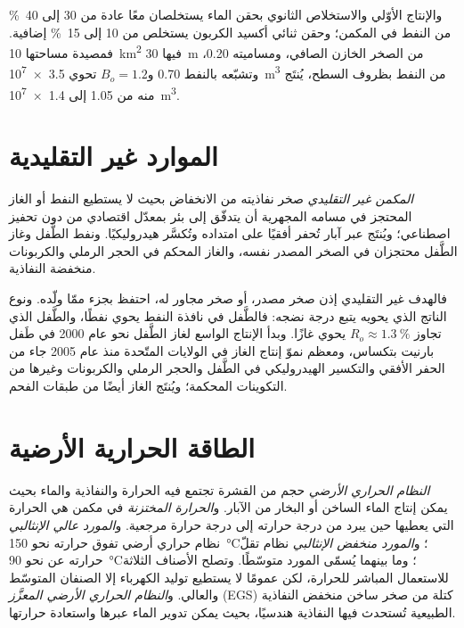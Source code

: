 والإنتاج الأوّلي والاستخلاص الثانوي بحقن الماء يستخلصان معًا عادة من 30 إلى \qty{40}{\percent} من النفط في المكمن؛ وحقن ثنائي
أكسيد الكربون يستخلص من 10 إلى \qty{15}{\percent} إضافية. فمصيدة مساحتها \qty{10}{km^2} فيها \qty{30}{m} من
الصخر الخازن الصافي، ومساميته 0.20، وتشبّعه بالنفط 0.70 و$B_o = 1.2$ تحوي \qty{3.5e7}{m^3} من النفط
بظروف السطح، يُنتَج منه من 1.05 إلى \qty{1.4e7}{m^3}.

\section{الموارد غير التقليدية}\label{sec:b2:energy-geology:unconventional}

\begin{definition}\label{def:b2:energy-geology:unconventional}
\emph{المكمن غير التقليدي} صخر نفاذيته من الانخفاض بحيث لا يستطيع
النفط أو الغاز المحتجز في مسامه المجهرية أن يتدفّق إلى بئر بمعدّل اقتصادي
من دون تحفيز اصطناعي؛ ويُنتَج عبر آبار تُحفر أفقيًا على امتداده
وتُكسَّر هيدروليكيًا. ونفط الطَّفل وغاز الطَّفل محتجزان في الصخر المصدر نفسه، والغاز المحكم في
الحجر الرملي والكربونات منخفضة النفاذية.
\end{definition}

فالهدف غير التقليدي إذن صخر مصدر، أو صخر مجاور له، احتفظ بجزء ممّا
ولّده. ونوع الناتج الذي يحويه يتبع درجة نضجه: فالطَّفل في نافذة النفط يحوي نفطًا،
والطَّفل الذي تجاوز $R_o \approx \qty{1.3}{\percent}$ يحوي غازًا. وبدأ الإنتاج الواسع لغاز الطَّفل نحو
عام 2000 في طَفل بارنيت بتكساس، ومعظم نموّ إنتاج الغاز في الولايات المتّحدة منذ
عام 2005 جاء من الحفر الأفقي والتكسير الهيدروليكي في الطَّفل والحجر الرملي والكربونات وغيرها
من التكوينات المحكمة؛ ويُنتَج الغاز أيضًا من طبقات الفحم.

\section{الطاقة الحرارية الأرضية}\label{sec:b2:energy-geology:geothermal}

\begin{definition}\label{def:b2:energy-geology:geothermal}
\emph{النظام الحراري الأرضي} حجم من القشرة تجتمع فيه الحرارة
والنفاذية والماء بحيث يمكن إنتاج الماء الساخن أو البخار من الآبار.
و\emph{الحرارة المختزنة} في مكمن هي الحرارة التي يعطيها حين يبرد
من درجة حرارته إلى درجة حرارة مرجعية. و\emph{المورد عالي الإنثالبي}
نظام حراري أرضي تفوق حرارته نحو \qty{150}{\celsius}؛ و\emph{المورد منخفض الإنثالبي}
نظام تقلّ حرارته عن نحو \qty{90}{\celsius}؛ وما بينهما يُسمّى
المورد متوسّطًا. وتصلح الأصناف الثلاثة للاستعمال المباشر للحرارة، لكن عمومًا لا يستطيع توليد الكهرباء إلا الصنفان المتوسّط
والعالي. و\emph{النظام الحراري الأرضي المعزَّز} (EGS) كتلة من
صخر ساخن منخفض النفاذية الطبيعية تُستحدث فيها النفاذية هندسيًا، بحيث يمكن تدوير الماء
عبرها واستعادة حرارتها.
\end{definition}

